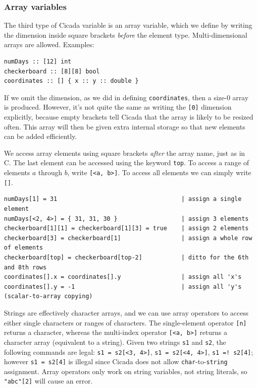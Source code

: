 \documentclass{article}
\newenvironment{code}{
       \begin{list}{}{
               \setlength{\leftmargin}{.4in}
               \setlength{\rightmargin}{0in}
               \setlength{\topsep}{.2in}
       }
       \small
       \item[] }
       { \end{list}   }
\begin{document}
\subsubsection{Array variables}

The third type of Cicada variable is an array variable, which we define by writing the dimension inside square brackets \emph{before} the element type.  Multi-dimensional arrays are allowed.  Examples:

\begin{code} \begin{verbatim}
numDays :: [12] int
checkerboard :: [8][8] bool
coordinates :: [] { x :: y :: double }
\end{verbatim} \end{code}

\noindent If we omit the dimension, as we did in defining \verb#coordinates#, then a size-0 array is produced.  However, it's not quite the same as writing the \verb#[0]# dimension explicitly, because empty brackets tell Cicada that the array is likely to be resized often.  This array will then be given extra internal storage so that new elements can be added efficiently.

We access array elements using square brackets \emph{after} the array name, just as in C.  The last element can be accessed using the keyword \verb#top#.  To access a range of elements $a$ through $b$, write \verb#[<a, b>]#.  To access all elements we can simply write \verb#[]#.

\begin{code} \begin{verbatim}
numDays[1] = 31                                   | assign a single element
numDays[<2, 4>] = { 31, 31, 30 }                  | assign 3 elements
checkerboard[1][1] = checkerboard[1][3] = true    | assign 2 elements
checkerboard[3] = checkerboard[1]                 | assign a whole row of elements
checkerboard[top] = checkerboard[top-2]           | ditto for the 6th and 8th rows
coordinates[].x = coordinates[].y                 | assign all 'x's
coordinates[].y = -1                              | assign all 'y's (scalar-to-array copying)
\end{verbatim} \end{code}

Strings are effectively character arrays, and we can use array operators to access either single characters or ranges of characters.  The single-element operator \verb#[n]# returns a character, whereas the multi-index operator \verb#[<a, b>]# returns a character array (equivalent to a string).  Given two strings \verb#s1# and \verb#s2#, the following commands are legal:  \verb#s1 = s2[<3, 4>]#, \verb#s1 = s2[<4, 4>]#, \verb#s1 =! s2[4]#; however \verb#s1 = s2[4]# is illegal since Cicada does not allow \verb#char#-to-\verb#string# assignment.  Array operators only work on string variables, not string literals, so \verb#"abc"[2]# will cause an error.
\end{document}
